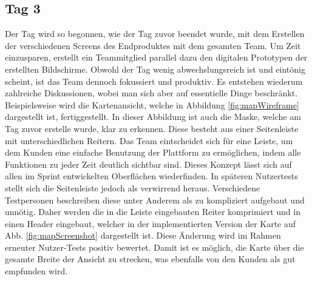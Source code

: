 \subsection*{\label{sec:Sprint-Umsetzung-Tag3}\thesubsection\quad Tag 3}Der Tag wird so begonnen, wie der Tag zuvor beendet wurde, mit dem Erstellen der verschiedenen Screens des Endproduktes mit dem gesamten Team. Um Zeit einzusparen, erstellt ein Teammitglied parallel dazu den digitalen Prototypen der erstellten Bildschirme. Obwohl der Tag wenig abwechslungsreich ist und eintönig scheint, ist das Team dennoch fokussiert und produktiv. Es entstehen wiederum zahlreiche Diskussionen, wobei man sich aber auf essentielle Dinge beschränkt. Beispielsweise wird die Kartenansicht, welche in Abbildung \ref{fig:mapWireframe} dargestellt ist, fertiggestellt. In dieser Abbildung ist auch die Maske, welche am Tag zuvor erstelle wurde, klar zu erkennen. Diese besteht aus einer Seitenleiste mit unterschiedlichen Reitern. Das Team eintscheidet sich für eine Leiste, um dem Kunden eine einfache Benutzung der Plattform zu ermöglichen, indem alle Funktionen zu jeder Zeit deutlich sichtbar sind. Dieses Konzept lässt sich auf allen im Sprint entwickelten Oberflächen wiederfinden. In späteren Nutzertests stellt sich die Seitenleiste jedoch als verwirrend heraus. Verschiedene Testpersonen beschreiben diese unter Anderem als zu kompliziert aufgebaut und unnötig. Daher werden die in die Leiste eingebauten Reiter komprimiert und in einen Header eingebaut, welcher in der implementierten Version der Karte auf Abb. \ref{fig:mapScreenshot} dargestellt ist. Diese Änderung wird im Rahmen erneuter Nutzer-Tests positiv bewertet. Damit ist es möglich, die Karte über die gesamte Breite der Ansicht zu strecken, was ebenfalls von den Kunden als gut empfunden wird.  

